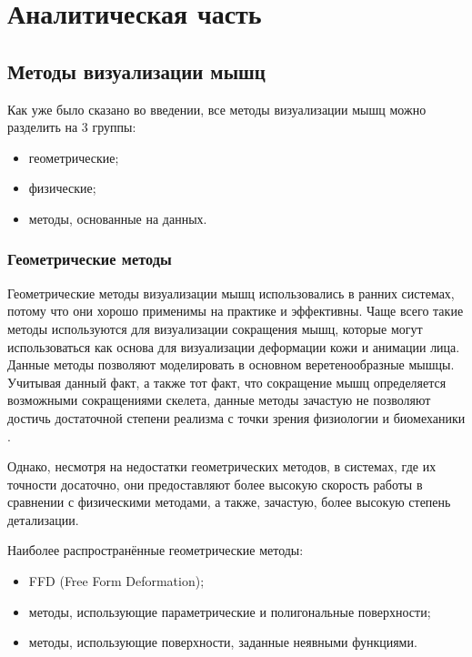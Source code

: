 \chapter{Аналитическая часть}

\section{Методы визуализации мышц}

Как уже было сказано во введении, все методы визуализации мышц можно разделить на 3 группы:
\begin{itemize}
    \item геометрические;
    \item физические;
    \item методы, основанные на данных.
\end{itemize}

\subsection{Геометрические методы}

Геометрические методы визуализации мышц использовались в ранних системах, потому что они хорошо применимы на практике и эффективны. Чаще всего такие методы используются для визуализации сокращения мышц, которые могут использоваться как основа для визуализации деформации кожи и анимации лица. Данные методы позволяют моделировать в основном веретенообразные мышцы. Учитывая данный факт, а также тот факт, что сокращение мышц определяется возможными сокращениями скелета, данные методы зачастую не позволяют достичь достаточной степени реализма с точки зрения физиологии и биомеханики \cite{bio}.

Однако, несмотря на недостатки геометрических методов, в системах, где их точности досаточно, они предоставляют более высокую скорость работы в сравнении с физическими методами, а также, зачастую, более высокую степень детализации.

Наиболее распространённые геометрические методы:
\begin{itemize}
    \item FFD (Free Form Deformation)\cite{ffd};
    \item методы, использующие параметрические и полигональные поверхности\cite{pps};
    \item методы, использующие поверхности, заданные неявными функциями\cite{is1}\cite{is2}.
\end{itemize}

